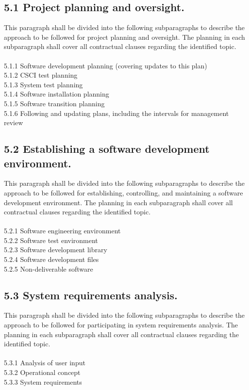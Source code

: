 \subsection{5.1 Project planning and oversight.}

This paragraph shall be divided into the following subparagraphs to
describe the approach to be followed for project planning and oversight.
The planning in each subparagraph shall cover all contractual clauses
regarding the identified topic. \\\\ 5.1.1 Software development planning
(covering updates to this plan) \\ 5.1.2 CSCI test planning \\ 5.1.3
System test planning \\ 5.1.4 Software installation planning \\ 5.1.5
Software transition planning \\ 5.1.6 Following and updating plans,
including the intervals for management review \\

\subsection{5.2 Establishing a software development environment.}

This paragraph shall be divided into the following subparagraphs to
describe the approach to be followed for establishing, controlling, and
maintaining a software development environment. The planning in each
subparagraph shall cover all contractual clauses regarding the
identified topic. \\\\ 5.2.1 Software engineering environment \\ 5.2.2
Software test environment \\ 5.2.3 Software development library \\ 5.2.4
Software development files \\ 5.2.5 Non-deliverable software

\subsection{5.3 System requirements analysis.}

This paragraph shall be divided into the following subparagraphs to
describe the approach to be followed for participating in system
requirements analysis. The planning in each subparagraph shall cover all
contractual clauses regarding the identified topic. \\\\ 5.3.1 Analysis
of user input \\ 5.3.2 Operational concept \\ 5.3.3 System requirements

